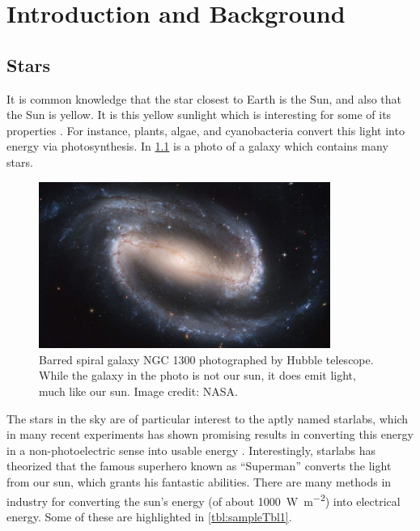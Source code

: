 
\chapter{Introduction and Background}
\thispagestyle{myheadings}

\section{Stars}

It is common knowledge that the star closest to Earth is the Sun, and also that the Sun is yellow. It is this yellow sunlight which is interesting for some of its properties \cite{scholes2011lessons}. For instance, plants, algae, and cyanobacteria convert this light into energy via photosynthesis. In \ref{fig:firstFig} is a photo of a galaxy which contains many stars.

\begin{figure}[ht]
    \centering
	\includegraphics[width=0.85\textwidth]{figures/sampleFig1.jpg}
	\caption[Barred spiral galaxy NGC 1300]{Barred spiral galaxy NGC 1300 photographed by Hubble telescope. While the galaxy in the photo is not our sun, it does emit light, much like our sun. Image credit: NASA.}
	\label{fig:firstFig}
\end{figure}

The stars in the sky are of particular interest to the aptly named \gls{starlabs}, which in many recent experiments has shown promising results in converting this energy in a non-photoelectric sense into usable energy \cite{allen2019fast}. Interestingly, \gls{starlabs} has theorized that the famous superhero known as ``Superman'' converts the light from our sun, which grants his fantastic abilities. There are many methods in industry for converting the sun's energy (of about \SI{1000}{\watt\per\meter\squared}) into electrical energy. Some of these are highlighted in \ref{tbl:sampleTbl1}.

